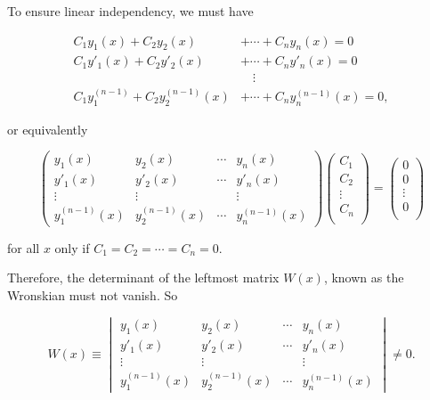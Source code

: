 \documentclass[english,a4paper,12pt]{report}
\begin{document}
To ensure linear independency, we must have

\begin{equation}
    \begin{aligned}
        C_1 y_1 (x) + C_2 y_2 (x) &+ \cdots + C_{n}y_{n}(x) = 0 \\
        C_1 y'_1 (x) + C_2 y'_2 (x) &+ \cdots + C_{n}y'_{n} (x) = 0 \\
        &\text{~~~} \vdots \\
        C_1 y_1 ^{(n-1)} + C_2 y_2 ^{(n-1)}(x) &+ \cdots + C_{n}y^{(n-1)}_{n}(x) = 0,       
    \end{aligned}
\end{equation}

or equivalently

\begin{equation}
    \begin{pmatrix}
        y_1 (x) & y_2 (x) & \cdots  & y_{n}(x)   \\
        y'_1(x) & y'_2 (x) & \cdots  & y'_{n}(x)   \\
        \vdots  & \vdots  &  & \vdots   \\
        y^{(n-1)}_1(x)  & y^{(n-1)}_2(x)  & \cdots  & y^{(n-1)}_{n} (x)
    \end{pmatrix} 
    \begin{pmatrix}
         C_1  \\
         C_2  \\
         \vdots  \\
         C_{n}  \\
    \end{pmatrix}
    = \begin{pmatrix}
         0 \\
         0 \\
         \vdots  \\
         0 \\
    \end{pmatrix}
\end{equation}

for all \(x\) only if \(C_1 = C_2 = \cdots  = C_{n} = 0 \).

Therefore, the determinant of the leftmost matrix \(W(x)\), known as the Wronskian must not vanish. So

\begin{equation}
    W(x) \equiv \begin{vmatrix}
        y_1 (x) & y_2 (x) & \cdots  & y_{n}(x)   \\
        y'_1(x) & y'_2 (x) & \cdots  & y'_{n}(x)   \\
        \vdots  & \vdots  &  & \vdots   \\
        y^{(n-1)}_1(x)  & y^{(n-1)}_2(x)  & \cdots  & y^{(n-1)}_{n} (x)
    \end{vmatrix} \neq 0.
\end{equation}
\end{document}
